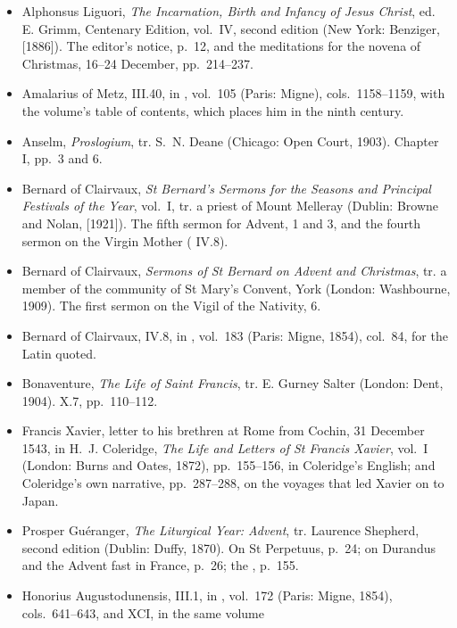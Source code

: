 \begin{itemize}[leftmargin=1.3em, itemsep=0.3em]
\item Alphonsus Liguori, \textit{The Incarnation, Birth and Infancy of Jesus Christ}, ed. E. Grimm,
Centenary Edition, vol.~IV, second edition (New York: Benziger, [1886]). The editor's notice,
p.~12, and the meditations for the novena of Christmas, 16--24 December, pp.~214--237.
\item Amalarius of Metz,  III.40, in , vol.~105
(Paris: Migne), cols.~1158--1159, with the volume's table of contents, which places him in the
ninth century.
\item Anselm, \textit{Proslogium}, tr. S.~N. Deane (Chicago: Open Court, 1903). Chapter I, pp.~3
and 6.
\item Bernard of Clairvaux, \textit{St Bernard's Sermons for the Seasons and Principal Festivals
of the Year}, vol.~I, tr. a priest of Mount Melleray (Dublin: Browne and Nolan, [1921]). The fifth
sermon for Advent, 1 and 3, and the fourth sermon on the Virgin Mother (
IV.8).
\item Bernard of Clairvaux, \textit{Sermons of St Bernard on Advent and Christmas}, tr. a member
of the community of St Mary's Convent, York (London: Washbourne, 1909). The first sermon on the
Vigil of the Nativity, 6.
\item Bernard of Clairvaux,  IV.8, in , vol.~183
(Paris: Migne, 1854), col.~84, for the Latin quoted.
\item Bonaventure, \textit{The Life of Saint Francis}, tr. E. Gurney Salter (London: Dent, 1904).
X.7, pp.~110--112.
\item Francis Xavier, letter to his brethren at Rome from Cochin, 31 December 1543, in
H.~J. Coleridge, \textit{The Life and Letters of St Francis Xavier}, vol.~I (London: Burns and
Oates, 1872), pp.~155--156, in Coleridge's English; and Coleridge's own narrative,
pp.~287--288, on the voyages that led Xavier on to Japan.
\item Prosper Guéranger, \textit{The Liturgical Year: Advent}, tr. Laurence Shepherd, second
edition (Dublin: Duffy, 1870). On St Perpetuus, p.~24; on Durandus and the Advent fast in
France, p.~26; the , p.~155.
\item Honorius Augustodunensis,  III.1, in ,
vol.~172 (Paris: Migne, 1854), cols.~641--643, and  XCI, in the same volume

\end{itemize}
